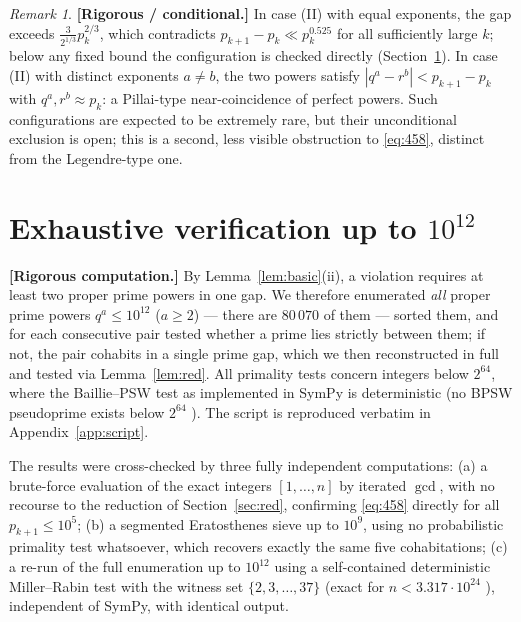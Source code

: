 \documentclass[11pt]{amsart}
\theoremstyle{definition}
\theoremstyle{remark}
\newtheorem{remark}[theorem]{Remark}
\begin{document}
\begin{remark}\label{rem:II}
\textbf{[Rigorous / conditional.]} In case (II) with equal exponents, the gap exceeds $\tfrac{3}{2^{1/3}}p_k^{2/3}$, which contradicts $p_{k+1}-p_k\ll p_k^{0.525}$ \cite{BHP} for all sufficiently large $k$; below any fixed bound the configuration is checked directly (Section~\ref{sec:verif}). In case (II) with distinct exponents $a\ne b$, the two powers satisfy $|q^a-r^b|<p_{k+1}-p_k$ with $q^a,r^b\approx p_k$: a Pillai-type near-coincidence of perfect powers. Such configurations are expected to be extremely rare, but their unconditional exclusion is open; this is a second, less visible obstruction to \eqref{eq:458}, distinct from the Legendre-type one.
\end{remark}

\section{Exhaustive verification up to $10^{12}$}\label{sec:verif}

\textbf{[Rigorous computation.]} By Lemma~\ref{lem:basic}(ii), a violation requires at least two proper prime powers in one gap. We therefore enumerated \emph{all} proper prime powers $q^a\le 10^{12}$ ($a\ge2$) --- there are $80\,070$ of them --- sorted them, and for each consecutive pair tested whether a prime lies strictly between them; if not, the pair cohabits in a single prime gap, which we then reconstructed in full and tested via Lemma~\ref{lem:red}. All primality tests concern integers below $2^{64}$, where the Baillie--PSW test as implemented in SymPy is deterministic (no BPSW pseudoprime exists below $2^{64}$ \cite{Gil}). The script is reproduced verbatim in Appendix~\ref{app:script}.

The results were cross-checked by three fully independent computations: (a) a brute-force evaluation of the exact integers $[1,\ldots,n]$ by iterated $\gcd$, with no recourse to the reduction of Section~\ref{sec:red}, confirming \eqref{eq:458} directly for all $p_{k+1}\le 10^{5}$; (b) a segmented Eratosthenes sieve up to $10^{9}$, using no probabilistic primality test whatsoever, which recovers exactly the same five cohabitations; (c) a re-run of the full enumeration up to $10^{12}$ using a self-contained deterministic Miller--Rabin test with the witness set $\{2,3,\ldots,37\}$ (exact for $n<3.317\cdot10^{24}$ \cite{SW}), independent of SymPy, with identical output.
\end{document}
